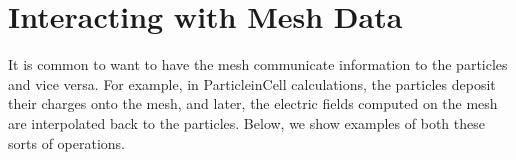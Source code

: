 \documentclass[letterpaper,10pt,english]{sphinxmanual}
\begin{document}
\section{Interacting with Mesh Data}
\label{\detokenize{Particle:interacting-with-mesh-data}}\label{\detokenize{Particle:sec-particles-interacting}}
\sphinxAtStartPar
It is common to want to have the mesh communicate information to the particles
and vice versa. For example, in Particle\sphinxhyphen{}in\sphinxhyphen{}Cell calculations, the particles
deposit their charges onto the mesh, and later, the electric fields computed on
the mesh are interpolated back to the particles. Below, we show examples of
both these sorts of operations.

\begin{sphinxVerbatim}[commandchars=\\\{\}]
      
        

        
       
         

        \PYG{p}{[}\PYG{p}{]}
        \PYG{p}{[}\PYG{p}{]}
        \PYG{p}{[}\PYG{p}{]}


\end{sphinxVerbatim}
\end{document}
